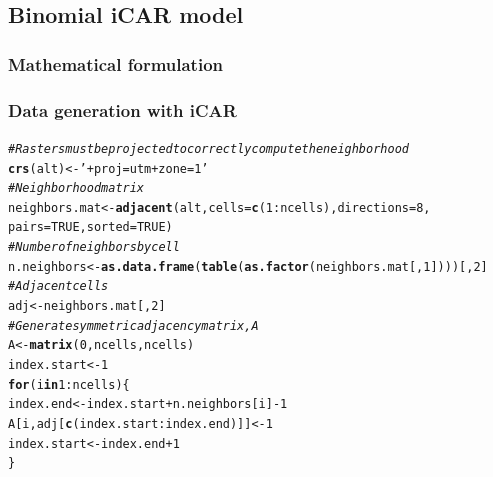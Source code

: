 \documentclass[a4paper, 12pt, leqno]{article}\usepackage[]{graphicx}\usepackage[]{color}
\makeatletter
\newcommand{\hlnum}[1]{\textcolor[rgb]{0.686,0.059,0.569}{#1}}%
\newcommand{\hlstr}[1]{\textcolor[rgb]{0.192,0.494,0.8}{#1}}%
\newcommand{\hlcom}[1]{\textcolor[rgb]{0.678,0.584,0.686}{\textit{#1}}}%
\newcommand{\hlopt}[1]{\textcolor[rgb]{0,0,0}{#1}}%
\newcommand{\hlstd}[1]{\textcolor[rgb]{0.345,0.345,0.345}{#1}}%
\newcommand{\hlkwa}[1]{\textcolor[rgb]{0.161,0.373,0.58}{\textbf{#1}}}%
\newcommand{\hlkwb}[1]{\textcolor[rgb]{0.69,0.353,0.396}{#1}}%
\newcommand{\hlkwc}[1]{\textcolor[rgb]{0.333,0.667,0.333}{#1}}%
\newcommand{\hlkwd}[1]{\textcolor[rgb]{0.737,0.353,0.396}{\textbf{#1}}}%
\newenvironment{kframe}{%
 \def\at@end@of@kframe{}%
 \ifinner\ifhmode%
  \def\at@end@of@kframe{\end{minipage}}%
  \begin{minipage}{\columnwidth}%
 \fi\fi%
 \def\FrameCommand##1{\hskip\@totalleftmargin \hskip-\fboxsep
 \colorbox{shadecolor}{##1}\hskip-\fboxsep
     \hskip-\linewidth \hskip-\@totalleftmargin \hskip\columnwidth}%
 \MakeFramed {\advance\hsize-\width
   \@totalleftmargin\z@ \linewidth\hsize
   \@setminipage}}%
 {\par\unskip\endMakeFramed%
 \at@end@of@kframe}
\newenvironment{knitrout}{}{} %
\makeatother
\begin{document}
\newpage

\subsection{Binomial iCAR model}

\subsubsection{Mathematical formulation}

\subsubsection{Data generation with iCAR}

\begin{knitrout}\small
{}\color{fgcolor}\begin{kframe}
\begin{alltt}
\hlcom{# Rasters must be projected to correctly compute the neighborhood}
\hlkwd{crs}\hlstd{(alt)} \hlkwb{<-} \hlstr{'+proj=utm +zone=1'}
\hlcom{# Neighborhood matrix}
\hlstd{neighbors.mat} \hlkwb{<-} \hlkwd{adjacent}\hlstd{(alt,} \hlkwc{cells}\hlstd{=}\hlkwd{c}\hlstd{(}\hlnum{1}\hlopt{:}\hlstd{ncells),} \hlkwc{directions}\hlstd{=}\hlnum{8}\hlstd{,}
                          \hlkwc{pairs}\hlstd{=}\hlnum{TRUE}\hlstd{,} \hlkwc{sorted}\hlstd{=}\hlnum{TRUE}\hlstd{)}
\hlcom{# Number of neighbors by cell}
\hlstd{n.neighbors} \hlkwb{<-} \hlkwd{as.data.frame}\hlstd{(}\hlkwd{table}\hlstd{(}\hlkwd{as.factor}\hlstd{(neighbors.mat[,}\hlnum{1}\hlstd{])))[,}\hlnum{2}\hlstd{]}
\hlcom{# Adjacent cells}
\hlstd{adj} \hlkwb{<-} \hlstd{neighbors.mat[,}\hlnum{2}\hlstd{]}
\hlcom{# Generate symmetric adjacency matrix, A}
\hlstd{A} \hlkwb{<-} \hlkwd{matrix}\hlstd{(}\hlnum{0}\hlstd{,ncells,ncells)}
\hlstd{index.start} \hlkwb{<-} \hlnum{1}
\hlkwa{for} \hlstd{(i} \hlkwa{in} \hlnum{1}\hlopt{:}\hlstd{ncells) \{}
    \hlstd{index.end} \hlkwb{<-} \hlstd{index.start}\hlopt{+}\hlstd{n.neighbors[i]}\hlopt{-}\hlnum{1}
    \hlstd{A[i,adj[}\hlkwd{c}\hlstd{(index.start}\hlopt{:}\hlstd{index.end)]]} \hlkwb{<-} \hlnum{1}
    \hlstd{index.start} \hlkwb{<-} \hlstd{index.end}\hlopt{+}\hlnum{1}
\hlstd{\}}
\end{alltt}
\end{kframe}
\end{knitrout}
\end{document}
